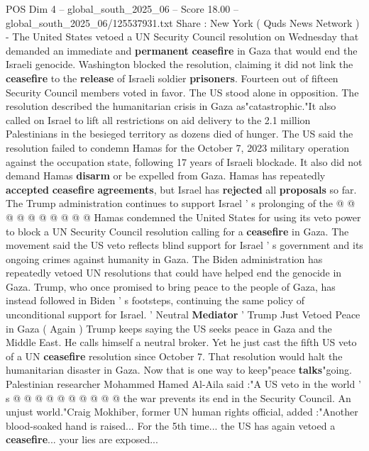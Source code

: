 \begin{textsample}{POS Dim 4 – global\_south\_2025\_06 – Score 18.00 – global\_south\_2025\_06/125537931.txt}  \label{ex:f4_pos_356}
Share : New York ( Quds News Network ) - The United States vetoed a UN Security Council resolution on Wednesday that demanded an immediate and \textbf{permanent} \textbf{ceasefire} in Gaza that would end the Israeli genocide.
Washington blocked the resolution, claiming it did not link the \textbf{ceasefire} to the \textbf{release} of Israeli soldier \textbf{prisoners}.
Fourteen out of fifteen Security Council members voted in favor.
The US stood alone in opposition.
The resolution described the humanitarian crisis in Gaza as"catastrophic."It also called on Israel to lift all restrictions on aid delivery to the 2.1 million Palestinians in the besieged territory as dozens died of hunger.
The US said the resolution failed to condemn Hamas for the October 7, 2023 military operation against the occupation state, following 17 years of Israeli blockade.
It also did not demand Hamas \textbf{disarm} or be expelled from Gaza.
Hamas has repeatedly \textbf{accepted} \textbf{ceasefire} \textbf{agreements}, but Israel has \textbf{rejected} all \textbf{proposals} so far.
The Trump administration continues to support Israel ' s prolonging of the @ @ @ @ @ @ @ @ @ @ Hamas condemned the United States for using its veto power to block a UN Security Council resolution calling for a \textbf{ceasefire} in Gaza.
The movement said the US veto reflects blind support for Israel ' s government and its ongoing crimes against humanity in Gaza.
The Biden administration has repeatedly vetoed UN resolutions that could have helped end the genocide in Gaza.
Trump, who once promised to bring peace to the people of Gaza, has instead followed in Biden ' s footsteps, continuing the same policy of unconditional support for Israel. ' Neutral \textbf{Mediator} ' Trump Just Vetoed Peace in Gaza ( Again ) Trump keeps saying the US seeks peace in Gaza and the Middle East.
He calls himself a neutral broker.
Yet he just cast the fifth US veto of a UN \textbf{ceasefire} resolution since October 7.
That resolution would halt the humanitarian disaster in Gaza.
Now that is one way to keep"peace \textbf{talks}"going.
Palestinian researcher Mohammed Hamed Al-Aila said :"A US veto in the world ' s @ @ @ @ @ @ @ @ @ @ the war prevents its end in the Security Council.
An unjust world."Craig Mokhiber, former UN human rights official, added :"Another blood-soaked hand is raised...
For the 5th time... the US has again vetoed a \textbf{ceasefire}... your lies are exposed...

\end{textsample}
